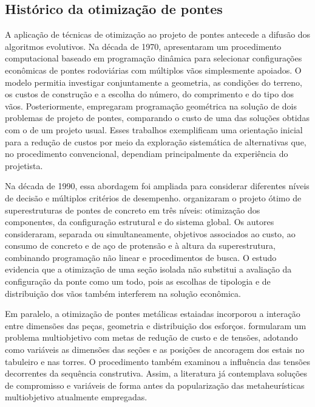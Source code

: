 \subsection{Histórico da otimização de pontes}\label{sec:historico_otimizacao_pontes}

A aplicação de técnicas de otimização ao projeto de pontes antecede a difusão dos algoritmos evolutivos.
Na década de 1970, \textcite{Aguilar1973} apresentaram um procedimento computacional baseado em programação dinâmica para selecionar configurações econômicas de pontes rodoviárias com múltiplos vãos simplesmente apoiados.
O modelo permitia investigar conjuntamente a geometria, as condições do terreno, os custos de construção e a escolha do número, do comprimento e do tipo dos vãos.
Posteriormente, \textcite{Brar1984} empregaram programação geométrica na solução de dois problemas de projeto de pontes, comparando o custo de uma das soluções obtidas com o de um projeto usual.
Esses trabalhos exemplificam uma orientação inicial para a redução de custos por meio da exploração sistemática de alternativas que, no procedimento convencional, dependiam principalmente da experiência do projetista.

Na década de 1990, essa abordagem foi ampliada para considerar diferentes níveis de decisão e múltiplos critérios de desempenho.
\textcite{CohnLounis1994} organizaram o projeto ótimo de superestruturas de pontes de concreto em três níveis: otimização dos componentes, da configuração estrutural e do sistema global.
Os autores consideraram, separada ou simultaneamente, objetivos associados ao custo, ao consumo de concreto e de aço de protensão e à altura da superestrutura, combinando programação não linear e procedimentos de busca.
O estudo evidencia que a otimização de uma seção isolada não substitui a avaliação da configuração da ponte como um todo, pois as escolhas de tipologia e de distribuição dos vãos também interferem na solução econômica.

Em paralelo, a otimização de pontes metálicas estaiadas incorporou a interação entre dimensões das peças, geometria e distribuição dos esforços.
\textcite{SimoesNegrao1994} formularam um problema multiobjetivo com metas de redução de custo e de tensões, adotando como variáveis as dimensões das seções e as posições de ancoragem dos estais no tabuleiro e nas torres.
O procedimento também examinou a influência das tensões decorrentes da sequência construtiva.
Assim, a literatura já contemplava soluções de compromisso e variáveis de forma antes da popularização das metaheurísticas multiobjetivo atualmente empregadas.

